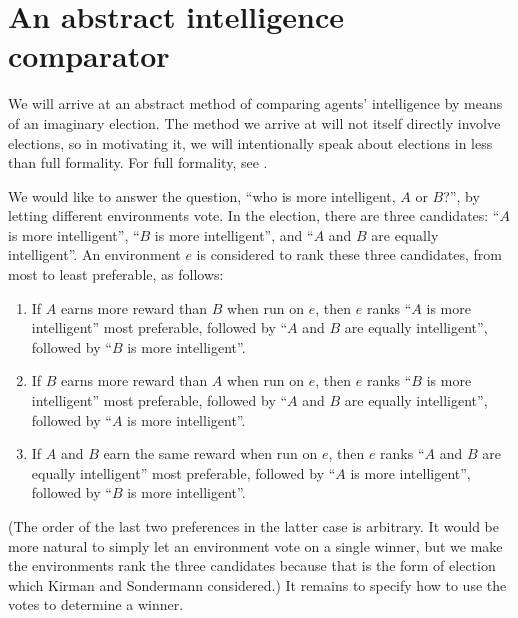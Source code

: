\documentclass[twoside,11pt]{article}
\begin{document}
\section{An abstract intelligence comparator}

We will arrive at an abstract method of comparing agents' intelligence by means of
an imaginary election. The method we arrive at will not itself directly involve elections,
so in motivating it, we will intentionally
speak about elections in less than full formality. For full formality, see \citet{kirman}.

We would like to answer the question,
``who is more intelligent, $A$ or $B$?'', by letting different
environments vote. In the election, there are three candidates: ``$A$ is more intelligent'',
``$B$ is more intelligent'', and ``$A$ and $B$ are equally intelligent''.
An environment $e$ is considered to rank these three candidates, from most to least
preferable, as follows:
\begin{enumerate}
    \item
    If $A$ earns more reward than $B$ when run on $e$,
    then $e$ ranks ``$A$ is more intelligent'' most preferable,
    followed by ``$A$ and $B$ are equally intelligent'', followed
    by ``$B$ is more intelligent''.
    \item
    If $B$ earns more reward than $A$ when run on $e$,
    then $e$ ranks ``$B$ is more intelligent'' most preferable,
    followed by ``$A$ and $B$ are equally intelligent'', followed
    by ``$A$ is more intelligent''.
    \item
    If $A$ and $B$ earn the same reward when run on $e$,
    then $e$ ranks ``$A$ and $B$ are equally intelligent'' most preferable,
    followed by ``$A$ is more intelligent'',
    followed by ``$B$ is more intelligent''.
\end{enumerate}
(The order of the last two preferences in the latter case is arbitrary.
It would be more natural to simply let an environment vote on a single winner,
but we make the environments rank the three candidates because that is the form
of election which
Kirman and Sondermann
considered.)
It remains to specify how to use the votes to determine a winner.
\end{document}
